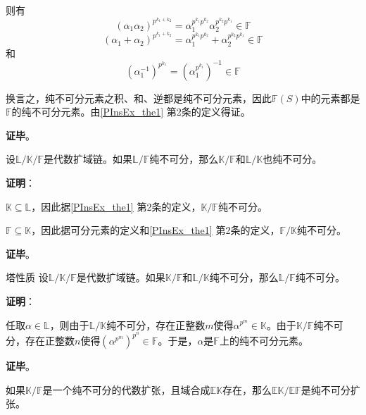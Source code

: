 则有
\begin{equation}\label{PInsEx_eq1}
(\alpha_1\alpha_2)^{p^{k_1+k_2}}=\alpha_1^{p^{k_1}p^{k_2}}\alpha_2^{p^{k_2}p^{k_1}}\in\mathbb{F}
\end{equation}
\begin{equation}\label{PInsEx_eq2}
(\alpha_1+\alpha_2)^{p^{k_1+k_2}}=\alpha_1^{p^{k_1}p^{k_2}}+\alpha_2^{p^{k_2}p^{k_1}}\in\mathbb{F}
\end{equation}
和
\begin{equation}\label{PInsEx_eq3}
(\alpha_1^{-1})^{p^{k_1}} = (\alpha_1^{p^{k_1}})^{-1} \in\mathbb{F}
\end{equation}

换言之，纯不可分元素之积、和、逆都是纯不可分元素，因此$\mathbb{F}(S)$中的元素都是$\mathbb{F}$的纯不可分元素。由\autoref{PInsEx_the1} 第2条的定义得证。

\textbf{证毕}。




\begin{theorem}{}
设$\mathbb{L}/\mathbb{K}/\mathbb{F}$是代数扩域链。如果$\mathbb{L}/\mathbb{F}$纯不可分，那么$\mathbb{K}/\mathbb{F}$和$\mathbb{L}/\mathbb{K}$也纯不可分。
\end{theorem}

\textbf{证明}：

$\mathbb{K}\subseteq\mathbb{L}$，因此据\autoref{PInsEx_the1} 第2条的定义，$\mathbb{K}/\mathbb{F}$纯不可分。

$\mathbb{F}\subseteq\mathbb{K}$，因此据可分元素的定义和\autoref{PInsEx_the1} 第2条的定义，$\mathbb{F}/\mathbb{K}$纯不可分。


\textbf{证毕}。


\begin{theorem}{塔性质}
设$\mathbb{L}/\mathbb{K}/\mathbb{F}$是代数扩域链。如果$\mathbb{K}/\mathbb{F}$和$\mathbb{L}/\mathbb{K}$纯不可分，那么$\mathbb{L}/\mathbb{F}$纯不可分。
\end{theorem}

\textbf{证明}：

任取$\alpha\in\mathbb{L}$，则由于$\mathbb{L}/\mathbb{K}$纯不可分，存在正整数$m$使得$\alpha^{p^m}\in\mathbb{K}$。由于$\mathbb{K}/\mathbb{F}$纯不可分，存在正整数$n$使得$(\alpha^{p^m})^{p^n}\in\mathbb{F}$。于是，$\alpha$是$\mathbb{F}$上的纯不可分元素。

\textbf{证毕}。


\begin{theorem}{}
如果$\mathbb{K}/\mathbb{F}$是一个纯不可分的代数扩张，且域合成$\mathbb{EK}$存在，那么$\mathbb{EK}/\mathbb{EF}$是纯不可分扩张。
\end{theorem}

